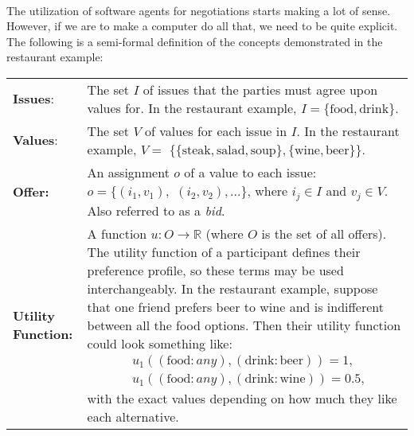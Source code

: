     \paragraph*{}
        The utilization of software agents for negotiations starts making a lot of sense. However, if we are to make a computer do all that, we need to be quite explicit. The following is a semi-formal definition of the concepts demonstrated in the restaurant example:

        \quad
        
        \renewcommand{\arraystretch}{1.5} %
        \begin{longtable}{l p{290pt}}

                \textbf{Issues}: & The set $I$ of issues that the parties must agree upon values for. In the restaurant example, $I=\{\text{food}, \text{drink}\}$. \\

                \textbf{Values}: & The set $V$ of values for each issue in $I$. In the restaurant example, $V=$ $\{\{\text{steak}, \text{salad}, \text{soup}\}, \{\text{wine}, \text{beer}\}\}$.\\

                \textbf{Offer:} & An assignment $o$ of a value to each issue: $o=\{(i_{1}, v_{1}),$ $(i_{2}, v_{2}), ...\}$, where $i_{j} \in I$ and $v_{j} \in V$. Also referred to as a \emph{bid}. \\

                \textbf{Utility Function:} & A function $u: O \to \mathbb{R}$ (where $O$ is the set of all offers). The utility function of a participant defines their preference profile, so these terms may be used interchangeably. In the restaurant example, suppose that one friend prefers beer to wine and is indifferent between all the food options. Then their utility function could look something like:
                \begin{equation*}
                    \begin{aligned}
                        & u_{1}((\text{food}: \textit{any}), (\text{drink}: \text{beer}))=1, \\
                        & u_{1}((\text{food}: \textit{any}), (\text{drink}: \text{wine}))=0.5,
                    \end{aligned}
                \end{equation*}
                with the exact values depending on how much they like each alternative.\\


\end{longtable}
